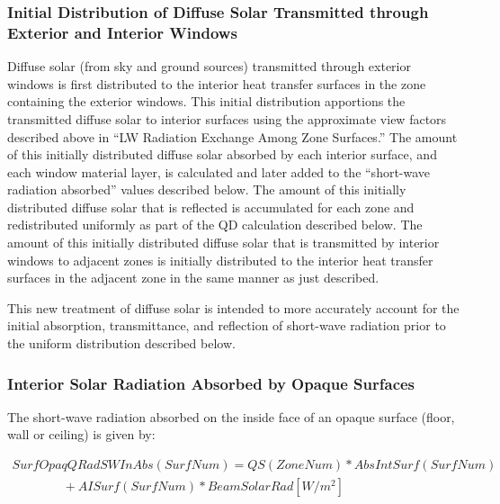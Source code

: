 \subsubsection{Initial Distribution of Diffuse Solar Transmitted through Exterior and Interior Windows}\label{initial-distribution-of-diffuse-solar-transmitted-through-exterior-and-interior-windows}

Diffuse solar (from sky and ground sources) transmitted through exterior windows is first distributed to the interior heat transfer surfaces in the zone containing the exterior windows. This initial distribution apportions the transmitted diffuse solar to interior surfaces using the approximate view factors described above in ``LW Radiation Exchange Among Zone Surfaces.'' The amount of this initially distributed diffuse solar absorbed by each interior surface, and each window material layer, is calculated and later added to the ``short-wave radiation absorbed'' values described below. The amount of this initially distributed diffuse solar that is reflected is accumulated for each zone and redistributed uniformly as part of the QD calculation described below. The amount of this initially distributed diffuse solar that is transmitted by interior windows to adjacent zones is initially distributed to the interior heat transfer surfaces in the adjacent zone in the same manner as just described.

This new treatment of diffuse solar is intended to more accurately account for the initial absorption, transmittance, and reflection of short-wave radiation prior to the uniform distribution described below.

\subsubsection{Interior Solar Radiation Absorbed by Opaque Surfaces}\label{interior-solar-radiation-absorbed-by-opaque-surfaces}

The short-wave radiation absorbed on the inside face of an opaque surface (floor, wall or ceiling) is given by:

\begin{equation}
\begin{array}{l}
SurfOpaqQRadSWInAbs(SurfNum) = QS(ZoneNum)*AbsIntSurf(SurfNum) \\
\quad \quad \quad \quad+ AISurf(SurfNum)*BeamSolarRad [W/m^2]
\end{array}
\label{eq:ShortWaveRadInsideFaceOpaqueSurf}
\end{equation}

